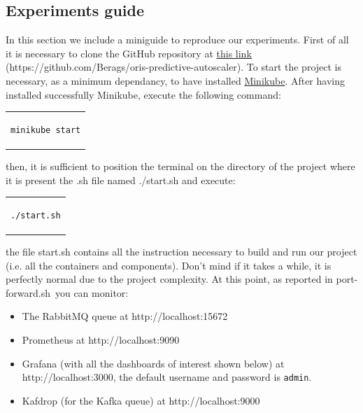 \subsection{Experiments guide}
In this section we include a miniguide to reproduce our experiments. First of all it is necessary to clone the GitHub repository at \href{https://github.com/Berags/oris-predictive-autoscaler}{this link} (https://github.com/Berags/oris-predictive-autoscaler). To start the project is necessary, as a minimum dependancy, to have installed \href{https://minikube.sigs.k8s.io/docs/}{Minikube}. After having installed successfully Minikube, execute the following command:

\begin{table}[!htb]
\centering
\begin{tabular}{c}
\begin{lstlisting}
minikube start
\end{lstlisting}
\end{tabular}
\end{table}

then, it is sufficient to position the terminal on the directory of the project where it is present the .sh file named ./start.sh and execute:

\begin{table}[!htb]
\centering
\begin{tabular}{c}
\begin{lstlisting}
./start.sh
\end{lstlisting}
\end{tabular}
\end{table}
the file start.sh contains all the instruction necessary to build and run our project (i.e. all the containers and components). Don't mind if it takes a while, it is perfectly normal due to the project complexity. At this point, as reported in \guillemotleft port-forward.sh\guillemotright \ you can monitor:
\begin{itemize}
  \item The RabbitMQ queue at \guillemotleft http://localhost:15672\guillemotright
  \item Prometheus at \guillemotleft http://localhost:9090\guillemotright
  \item Grafana (with all the dashboards of interest shown below) at \guillemotleft http://localhost:3000\guillemotright, the default username and password is \verb|admin|.
  \item Kafdrop (for the Kafka queue) at \guillemotleft http://localhost:9000\guillemotright
\end{itemize}

